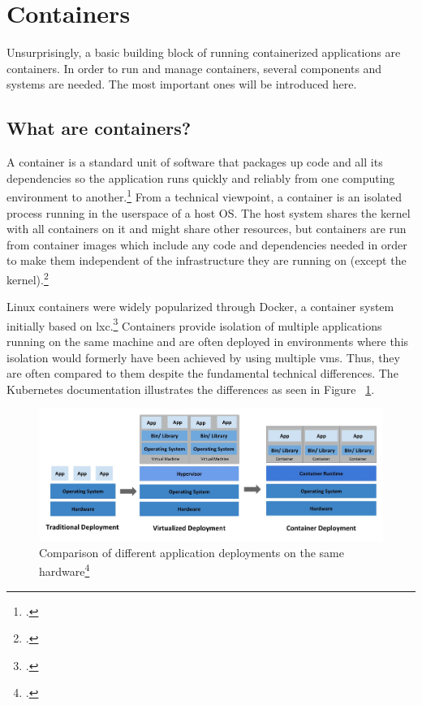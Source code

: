 \section{Containers}

Unsurprisingly, a basic building block of running containerized applications are containers.
In order to run and manage containers, several components and systems are needed. The most important ones will be introduced here.

\subsection{What are containers?}
A container is a standard unit of software that packages up code and all its dependencies so the application runs quickly and reliably from one computing environment to another.\footcite[][, section 'Package Software into Standardized Units for Development, Shipment and Deployment']{whatContainer}
From a technical viewpoint, a container is an isolated process running in the userspace of a host OS. The host system shares the kernel with all containers on it and might share other resources, but containers are run from container images which include any code and dependencies needed in order to make them independent of the infrastructure they are running on (except the kernel).\footcite[][, slide 13]{containerIntro}

Linux containers were widely popularized through Docker, a container system initially based on \gls{lxc}.\footcite[][, section '2013: Docker']{containerHistory}
Containers provide isolation of multiple applications running on the same machine and are often deployed in environments where this isolation would formerly have been achieved by using multiple \gls{vm}s. Thus, they are often compared to them despite the fundamental technical differences. The Kubernetes documentation illustrates the differences as seen in Figure ~\ref{fig:VMsVsContainers}.

\begin{figure}[H]
\includegraphics[scale=0.3]{pictures/VMsVsContainers.jpg} 
\caption{Comparison of different application deployments on the same hardware\protect\footcite[][, section 'Going back in time']{k8sBasics}}
\label{fig:VMsVsContainers}
\end{figure}

